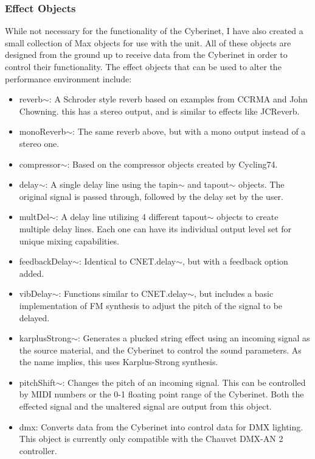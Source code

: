 \subsubsection{Effect Objects}

While not necessary for the functionality of the Cyberinet, I have also created a small collection of Max objects for use with the unit. All of these objects are designed from the ground up to receive data from the Cyberinet in order to control their functionality. The effect objects that can be used to alter the performance environment include:

\begin{itemize}
    \item reverb$\sim$: A Schroder style reverb based on examples from CCRMA and John Chowning. this has a stereo output, and is similar to effects like JCReverb.
    \item monoReverb$\sim$: The same reverb above, but with a mono output instead of a stereo one.
    \item compressor$\sim$: Based on the compressor objects created by Cycling74.
    \item delay$\sim$: A single delay line using the tapin$\sim$ and tapout$\sim$ objects. The original signal is passed through, followed by the delay set by the user.
    \item multDel$\sim$: A delay line utilizing 4 different tapout$\sim$ objects to create multiple delay lines. Each one can have its individual output level set for unique mixing capabilities.
    \item feedbackDelay$\sim$: Identical to CNET.delay$\sim$, but with a feedback option added.
    \item vibDelay$\sim$: Functions similar to CNET.delay$\sim$, but includes a basic implementation of FM synthesis to adjust the pitch of the signal to be delayed. 
    \item karplusStrong$\sim$: Generates a plucked string effect using an incoming signal as the source material, and the Cyberinet to control the sound parameters. As the name implies, this uses Karplus-Strong synthesis.
    \item pitchShift$\sim$: Changes the pitch of an incoming signal. This can be controlled by MIDI  numbers or the 0-1 floating point range of the Cyberinet. Both the effected signal and the unaltered signal are output from this object.
    \item dmx: Converts data from the Cyberinet into control data for DMX lighting. This object is currently only compatible with the Chauvet DMX-AN 2 controller.
\end{itemize}

